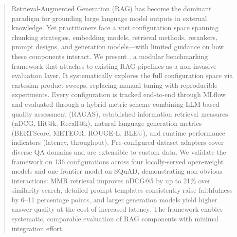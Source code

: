 \begin{abstract}
Retrieval-Augmented Generation (RAG) has become the dominant paradigm for grounding large language model outputs in external knowledge. Yet practitioners face a vast configuration space spanning chunking strategies, embedding models, retrieval methods, rerankers, prompt designs, and generation models---with limited guidance on how these components interact. We present \toolname{}, a modular benchmarking framework that attaches to existing RAG pipelines as a non-invasive evaluation layer. It systematically explores the full configuration space via cartesian product sweeps, replacing manual tuning with reproducible experiments. Every configuration is tracked end-to-end through MLflow and evaluated through a hybrid metric scheme combining LLM-based quality assessment (RAGAS), established information retrieval measures (nDCG, Hit@k, Recall@k), natural language generation metrics (BERTScore, METEOR, ROUGE-L, BLEU), and runtime performance indicators (latency, throughput). Pre-configured dataset adapters cover diverse QA domains and are extensible to custom data. We validate the framework on 136 configurations across four locally-served open-weight models and one frontier model on SQuAD, demonstrating non-obvious interactions: MMR retrieval improves nDCG@5 by up to 21\% over similarity search, detailed prompt templates consistently raise faithfulness by 6--11 percentage points, and larger generation models yield higher answer quality at the cost of increased latency. The framework enables systematic, comparable evaluation of RAG components with minimal integration effort.

\end{abstract}
